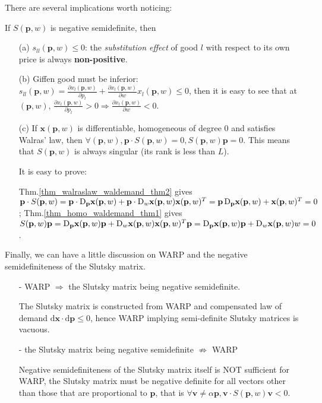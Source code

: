 There are several implications worth noticing:
\begin{theorem} If $S(\mathbf{p},w)$ is negative semidefinite, then
    \begin{enumerate}
        \item[(a)] $s_{ll}(\mathbf{p},w)\leq 0$: the \textit{substitution effect} of good $l$ with respect to its own price is always \textbf{non-positive}.
        \item[(b)] Giffen good must be inferior: $s_{ll}(\mathbf{p},w)=\frac{\partial x_l(\mathbf{p},w)}{\partial p_l}+\frac{\partial x_l(\mathbf{p},w)}{\partial w}x_l(\mathbf{p},w)\leq 0$, then it is easy to see that at $(\mathbf{p},w)$, $\frac{\partial x_l(\mathbf{p},w)}{\partial p_l}>0\Rightarrow \frac{\partial x_l(\mathbf{p},w)}{\partial w}<0$.
        \item[(c)] If $\mathbf{x}(\mathbf{p},w)$ is differentiable, homogeneous of degree 0 and satisfies Walras' law, then $\forall (\mathbf{p},w), \mathbf{p}\cdot S(\mathbf{p},w)=0, S(\mathbf{p},w)\mathbf{p}=0$. This means that $S(\mathbf{p},w)$ is always singular (its rank is less than $L$).
        
        It is easy to prove:

        Thm.\ref{thm_walraslaw_waldemand_thm2} gives $\mathbf{p}\cdot S(\mathbf{p},w)=\mathbf{p}\cdot \mathop{}\!\mathrm{D}_{\mathbf{p}}\mathbf{x}(\mathbf{p},w)+\mathbf{p}\cdot \mathop{}\!\mathrm{D}_w \mathbf{x}(\mathbf{p},w)\mathbf{x}(\mathbf{p},w)^T =\mathbf{p}\mathop{}\!\mathrm{D}_{\mathbf{p}}\mathbf{x}(\mathbf{p},w)+\mathbf{x}(\mathbf{p},w)^T=0$;
        Thm.\ref{thm_homo_waldemand_thm1} gives $S(\mathbf{p},w)\mathbf{p}=\mathop{}\!\mathrm{D}_{\mathbf{p}}\mathbf{x}(\mathbf{p},w)\mathbf{p}+\mathop{}\!\mathrm{D}_w\mathbf{x}(\mathbf{p},w)\mathbf{x}(\mathbf{p},w)^T\mathbf{p}=\mathop{}\!\mathrm{D}_{\mathbf{p}}\mathbf{x}(\mathbf{p},w)\mathbf{p}+\mathop{}\!\mathrm{D}_w\mathbf{x}(\mathbf{p},w)w=0$.
    \end{enumerate}
\end{theorem}

Finally, we can have a little discussion on WARP and the negative semidefiniteness of the Slutsky matrix.

\begin{enumerate}
    \item[-] WARP $\Rightarrow$ the Slutsky matrix being negative semidefinite.
    
    The Slutsky matrix is constructed from WARP and compensated law of demand $\mathrm{d}\mathbf{x}\cdot \mathrm{d}\mathbf{p}\leq 0$, hence WARP implying semi-definite Slutsky matrices is vacuous.

    \item[-] the Slutsky matrix being negative semidefinite $\not\Rightarrow$ WARP
    
    Negative semidefiniteness of the Slutsky matrix itself is NOT sufficient for WARP, the Slutsky matrix must be negative definite for all vectors other than those that are proportional to $\mathbf{p}$, that is $\forall \mathbf{v}\neq \alpha \mathbf{p}, \mathbf{v}\cdot S(\mathbf{p},w)\mathbf{v}<0$.
    
\end{enumerate}

